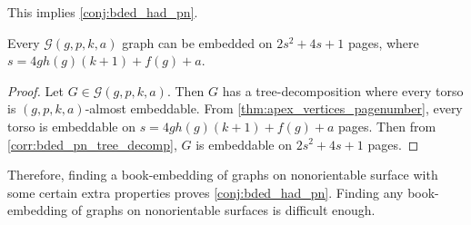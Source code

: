 This implies \cref{conj:bded_had_pn}.
\begin{corollary}
	Every $\mathcal{G}(g, p, k, a)$ graph can be embedded on $2s^2 + 4s + 1$ pages, where $s =  4g h(g) (k + 1) + f(g) + a$. 
\end{corollary}

\begin{proof}
	Let $G \in \mathcal{G}(g, p, k, a)$. Then $G$ has a tree-decomposition where every torso is $(g, p, k, a)$-almost embeddable. From \cref{thm:apex_vertices_pagenumber}, every torso is embeddable on $s = 4g h(g) (k + 1) + f(g) + a$ pages. Then from \cref{corr:bded_pn_tree_decomp}, $G$ is embeddable on $2s^2 + 4s + 1$ pages.
\end{proof}

Therefore, finding a book-embedding of graphs on nonorientable surface with some certain extra properties proves \cref{conj:bded_had_pn}. Finding any book-embedding of graphs on nonorientable surfaces is difficult enough. 